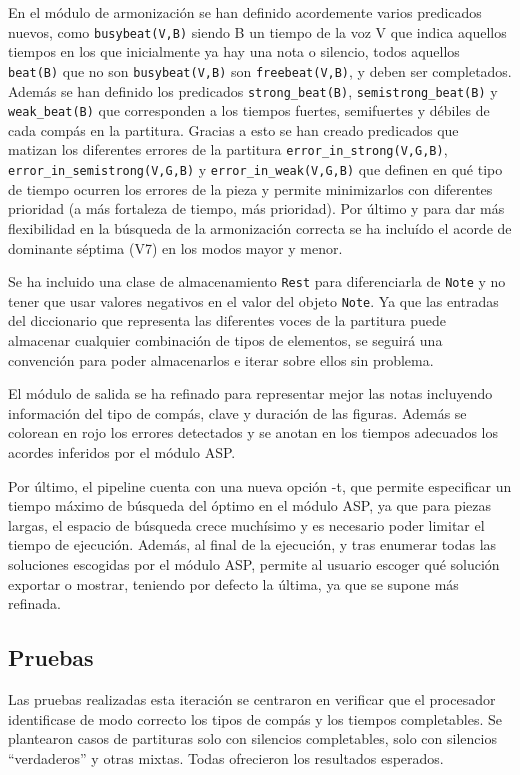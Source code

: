 En el módulo de armonización se han definido acordemente varios predicados nuevos, como \texttt{busybeat(V,B)} siendo B un tiempo de la voz V que indica aquellos tiempos en los que inicialmente ya hay una nota o silencio, todos aquellos \texttt{beat(B)} que no son \texttt{busybeat(V,B)} son \texttt{freebeat(V,B)}, y deben ser completados. Además se han definido los predicados \texttt{strong\_beat(B)}, \texttt{semistrong\_beat(B)} y \texttt{weak\_beat(B)} que corresponden a los tiempos fuertes, semifuertes y débiles de cada compás en la partitura. Gracias a esto se han creado predicados que matizan los diferentes errores de la partitura \texttt{error\_in\_strong(V,G,B)}, \texttt{error\_in\_semistrong(V,G,B)} y \texttt{error\_in\_weak(V,G,B)} que definen en qué tipo de tiempo ocurren los errores de la pieza y permite minimizarlos con diferentes prioridad (a más fortaleza de tiempo, más prioridad). Por último y para dar más flexibilidad en la búsqueda de la armonización correcta se ha incluído el acorde de dominante séptima (V7) en los modos mayor y menor.

Se ha incluido una clase de almacenamiento \texttt{Rest} para diferenciarla de \texttt{Note} y no tener que usar valores negativos en el valor del objeto \texttt{Note}. Ya que las entradas del diccionario que representa las diferentes voces de la partitura puede almacenar cualquier combinación de tipos de elementos, se seguirá una convención para poder almacenarlos e iterar sobre ellos sin problema.

El módulo de salida se ha refinado para representar mejor las notas incluyendo información del tipo de compás, clave y duración de las figuras. Además se colorean en rojo los errores detectados y se anotan en los tiempos adecuados los acordes inferidos por el módulo ASP.

Por último, el pipeline cuenta con una nueva opción -t, que permite especificar un tiempo máximo de búsqueda del óptimo en el módulo ASP, ya que para piezas largas, el espacio de búsqueda crece muchísimo y es necesario poder limitar el tiempo de ejecución. Además, al final de la ejecución, y tras enumerar todas las soluciones escogidas por el módulo ASP, permite al usuario escoger qué solución exportar o mostrar, teniendo por defecto la última, ya que se supone más refinada.

\subsection{Pruebas}
Las pruebas realizadas esta iteración se centraron en verificar que el procesador identificase de modo correcto los tipos de compás y los tiempos completables. Se plantearon casos de partituras solo con silencios completables, solo con silencios ``verdaderos'' y otras mixtas. Todas ofrecieron los resultados esperados.

